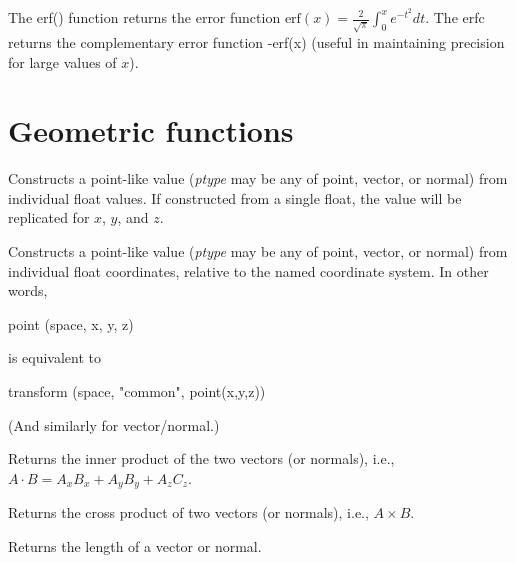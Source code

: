 \documentclass[11pt,letterpaper]{book}
\def\float{{\cf float}\xspace}
\def\normal{{\cf normal}\xspace}
\def\point{{\cf point}\xspace}
\def\vector{{\cf vector}\xspace}
\begin{document}
 
The {\cf erf()} function returns the error function 
${\mathrm{erf}(x) = \frac{2}{\sqrt{\pi}} \int_0^x e^{-t^2}} dt$.
The {\cf erfc} returns the complementary error function {-erf(x)}
(useful in maintaining precision for large values of $x$).
\apiend

\section{Geometric functions}
\label{sec:stdlib:geom}


Constructs a point-like value (\emph{ptype} may be any of \point,
\vector, or \normal) from individual \float values.  If constructed
from a single \float, the value will be replicated for $x$, $y$, and $z$.

\apiend

  
Constructs a point-like value (\emph{ptype} may be any of \point,
\vector, or \normal) from individual \float coordinates, relative
to the named coordinate system.  In other words,
\begin{code}
    point (space, x, y, z)
\end{code}
\noindent is equivalent to
\begin{code}
    transform (space, "common", point(x,y,z))
\end{code}
(And similarly for \vector/\normal.)
\apiend

Returns the inner product of the two vectors (or normals), i.e., 
$A \cdot B = A_x B_x + A_y B_y + A_z C_z$.
\apiend

Returns the cross product of two vectors (or normals), i.e., 
$A \times B$.
\apiend

Returns the length of a vector or normal.
\apiend
\end{document}
